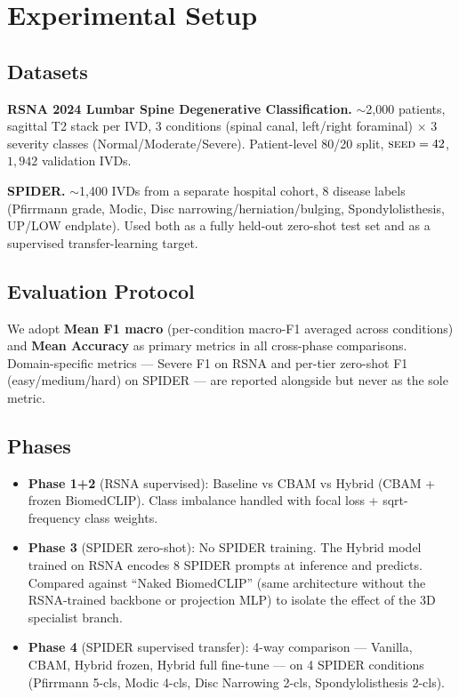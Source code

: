 \section{Experimental Setup}
\label{sec:experiments}

\subsection{Datasets}
\textbf{RSNA 2024 Lumbar Spine Degenerative Classification.}
$\sim$2{,}000 patients, sagittal T2 stack per IVD, 3 conditions
(spinal canal, left/right foraminal) $\times$ 3 severity classes
(Normal/Moderate/Severe). Patient-level 80/20 split, $\textsc{seed}=42$,
$1{,}942$ validation IVDs.

\textbf{SPIDER.} $\sim$1{,}400 IVDs from a separate hospital cohort, 8
disease labels (Pfirrmann grade, Modic, Disc narrowing/herniation/bulging,
Spondylolisthesis, UP/LOW endplate). Used both as a fully held-out
zero-shot test set and as a supervised transfer-learning target.

\subsection{Evaluation Protocol}
We adopt \textbf{Mean F1 macro} (per-condition macro-F1 averaged across
conditions) and \textbf{Mean Accuracy} as primary metrics in all
cross-phase comparisons. Domain-specific metrics — Severe F1 on RSNA
and per-tier zero-shot F1 (easy/medium/hard) on SPIDER — are reported
alongside but never as the sole metric.

\subsection{Phases}
\begin{itemize}
  \item \textbf{Phase 1+2} (RSNA supervised): Baseline vs CBAM vs
        Hybrid (CBAM + frozen BiomedCLIP). Class imbalance handled
        with focal loss + sqrt-frequency class weights.
  \item \textbf{Phase 3} (SPIDER zero-shot): No SPIDER training. The
        Hybrid model trained on RSNA encodes 8 SPIDER prompts at
        inference and predicts. Compared against ``Naked BiomedCLIP''
        (same architecture without the RSNA-trained backbone or
        projection MLP) to isolate the effect of the 3D specialist
        branch.
  \item \textbf{Phase 4} (SPIDER supervised transfer): 4-way
        comparison — Vanilla, CBAM, Hybrid frozen, Hybrid full
        fine-tune — on 4 SPIDER conditions (Pfirrmann 5-cls,
        Modic 4-cls, Disc Narrowing 2-cls, Spondylolisthesis 2-cls).
\end{itemize}

